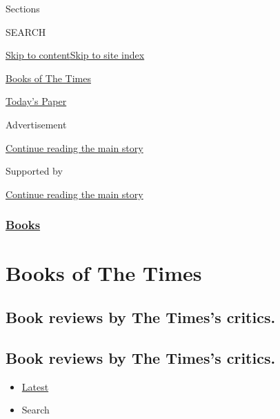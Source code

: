 Sections

SEARCH

\protect\hyperlink{site-content}{Skip to
content}\protect\hyperlink{site-index}{Skip to site index}

\href{https://www.nytimes.com/column/books-of-the-times}{Books of The
Times}

\href{https://myaccount.nytimes.com/auth/login?response_type=cookie\&client_id=vi}{}

\href{https://www.nytimes.com/section/todayspaper}{Today's Paper}

Advertisement

\protect\hyperlink{after-top}{Continue reading the main story}

Supported by

\protect\hyperlink{after-sponsor}{Continue reading the main story}

\hypertarget{books}{%
\subsubsection{\texorpdfstring{\href{/section/books}{Books}}{Books}}\label{books}}

\hypertarget{books-of-the-times}{%
\section{Books of The Times}\label{books-of-the-times}}

\hypertarget{book-reviews-by-the-timess-critics}{%
\subsection{Book reviews by The Times's
critics.}\label{book-reviews-by-the-timess-critics}}

\hypertarget{book-reviews-by-the-timess-critics-1}{%
\subsection{Book reviews by The Times's
critics.}\label{book-reviews-by-the-timess-critics-1}}

\begin{itemize}
\tightlist
\item
  \protect\hyperlink{stream-panel}{Latest}
\item
  Search
\end{itemize}

